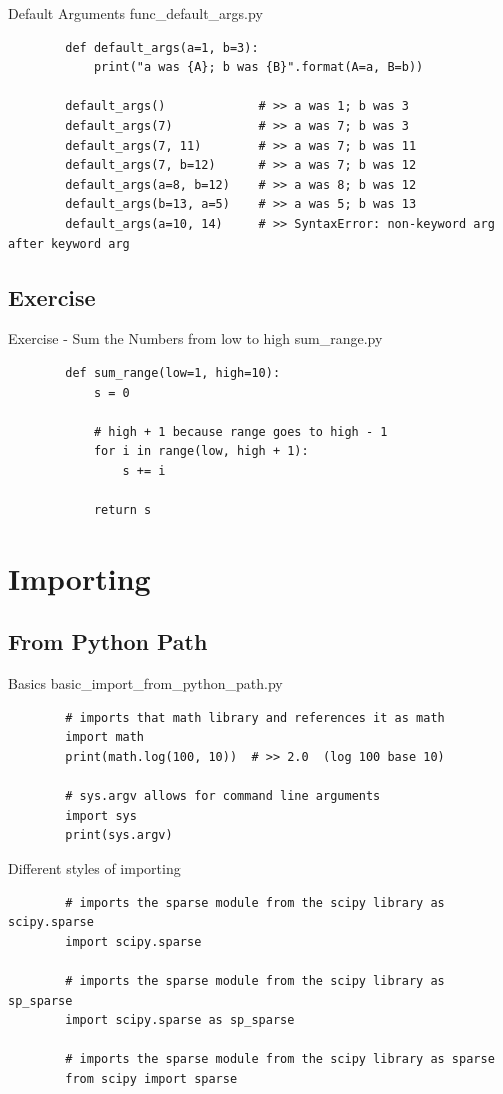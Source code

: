 \documentclass[11pt]{beamer}
\begin{document}
\begin{frame}[fragile]{Default Arguments}
	func\_default\_args.py
	\begin{lstlisting}
		def default_args(a=1, b=3):
		    print("a was {A}; b was {B}".format(A=a, B=b))
		
		default_args()             # >> a was 1; b was 3
		default_args(7)            # >> a was 7; b was 3
		default_args(7, 11)        # >> a was 7; b was 11
		default_args(7, b=12)      # >> a was 7; b was 12
		default_args(a=8, b=12)    # >> a was 8; b was 12
		default_args(b=13, a=5)    # >> a was 5; b was 13
		default_args(a=10, 14)     # >> SyntaxError: non-keyword arg after keyword arg
	\end{lstlisting}
\end{frame}

\subsection{Exercise}
\begin{frame}[fragile]{Exercise - Sum the Numbers from low to high}
	sum\_range.py
	\pause
	\begin{lstlisting}
		def sum_range(low=1, high=10):
		    s = 0
		    
		    # high + 1 because range goes to high - 1
		    for i in range(low, high + 1):
		        s += i
			
		    return s
	\end{lstlisting}
\end{frame}

\section{Importing}
\subsection{From Python Path}
\begin{frame}[fragile]{Basics}
	basic\_import\_from\_python\_path.py
	\begin{lstlisting}
		# imports that math library and references it as math
		import math
		print(math.log(100, 10))  # >> 2.0  (log 100 base 10)
		
		# sys.argv allows for command line arguments
		import sys
		print(sys.argv)
	\end{lstlisting}
\end{frame}
		
\begin{frame}[fragile]{Different styles of importing}
	\begin{lstlisting}
		# imports the sparse module from the scipy library as scipy.sparse
		import scipy.sparse
		
		# imports the sparse module from the scipy library as sp_sparse
		import scipy.sparse as sp_sparse
		
		# imports the sparse module from the scipy library as sparse
		from scipy import sparse
	\end{lstlisting}
\end{frame}
\end{document}
